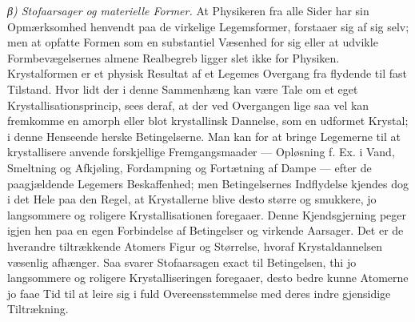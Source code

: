 \documentclass[12pt,a4paper]{book}
\newcommand{\subrunin}[1]{\emph{#1}\hspace{0.4em}}
\begin{document}
\subrunin{β) Stofaarsager og materielle Former.} At Physikeren fra alle
Sider har sin Opmærksomhed henvendt
paa de virkelige Legemsformer, forstaaer sig af sig selv; men at opfatte
Formen som en substantiel Væsenhed for sig eller at udvikle
Formbevægelsernes almene Realbegreb ligger slet ikke for Physiken.
Krystalformen er et physisk Resultat af et Legemes Overgang fra flydende
til fast Tilstand. Hvor lidt der i denne Sammenhæng kan være Tale om et
eget Krystallisationsprincip, sees deraf, at der ved Overgangen lige saa
vel kan fremkomme en amorph eller blot krystallinsk Dannelse, som en
udformet Krystal; i denne Henseende herske Betingelserne. Man kan for at
bringe Legemerne til at krystallisere anvende forskjellige
Fremgangsmaader --- Opløsning f. Ex. i Vand, Smeltning og Afkjøling,
Fordampning og Fortætning af Dampe --- efter de paagjældende Legemers
Beskaffenhed; men Betingelsernes Indflydelse kjendes dog i det Hele paa
den Regel, at Krystallerne blive desto større og smukkere, jo
langsommere og roligere Krystallisationen foregaaer. Denne
Kjendsgjerning peger igjen hen paa en egen Forbindelse af Betingelser og
virkende Aarsager. Det er de hverandre tiltrækkende Atomers Figur og
Størrelse, hvoraf Krystaldannelsen væsenlig afhænger. Saa svarer
Stofaarsagen exact til Betingelsen, thi jo langsommere og roligere
Krystalliseringen foregaaer, desto bedre kunne Atomerne jo faae Tid til
at leire sig i fuld Overeensstemmelse med deres indre gjensidige
Tiltrækning.
\end{document}
